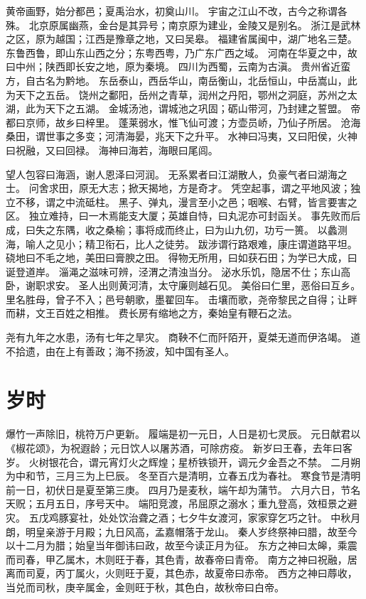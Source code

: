 \documentclass[12pt,UTF8]{ctexbook}
\begin{document}
黄帝画野，始分都邑；夏禹治水，初奠山川。
宇宙之江山不改，古今之称谓各殊。
北京原属幽燕，金台是其异号；南京原为建业，金陵又是别名。
浙江是武林之区，原为越国；江西是豫章之地，又曰吴皋。
福建省属闽中，湖广地名三楚。
东鲁西鲁，即山东山西之分；东粤西粤，乃广东广西之域。
河南在华夏之中，故曰中州；陕西即长安之地，原为秦境。
四川为西蜀，云南为古滇。
贵州省近蛮方，自古名为黔地。
东岳泰山，西岳华山，南岳衡山，北岳恒山，中岳嵩山，此为天下之五岳。
饶州之鄱阳，岳州之青草，润州之丹阳，鄂州之洞庭，苏州之太湖，此为天下之五湖。
金城汤池，谓城池之巩固；砺山带河，乃封建之誓盟。
帝都曰京师，故乡曰梓里。
蓬莱弱水，惟飞仙可渡；方壶员峤，乃仙子所居。
沧海桑田，谓世事之多变；河清海晏，兆天下之升平。
水神曰冯夷，又曰阳侯，火神曰祝融，又曰回禄。
海神曰海若，海眼曰尾闾。

望人包容曰海涵，谢人恩泽曰河润。
无系累者曰江湖散人，负豪气者曰湖海之士。
问舍求田，原无大志；掀天揭地，方是奇才。
凭空起事，谓之平地风波；独立不移，谓之中流砥柱。
黑子、弹丸，漫言至小之邑；咽喉、右臂，皆言要害之区。
独立难持，曰一木焉能支大厦；英雄自恃，曰丸泥亦可封函关。
事先败而后成，曰失之东隅，收之桑榆；事将成而终止，曰为山九仞，功亏一篑。
以蠡测海，喻人之见小；精卫衔石，比人之徒劳。
跋涉谓行路艰难，康庄谓道路平坦。
硗地曰不毛之地，美田曰膏腴之田。
得物无所用，曰如获石田；为学已大成，曰诞登道岸。
淄渑之滋味可辨，泾渭之清浊当分。
泌水乐饥，隐居不仕；东山高卧，谢职求安。
圣人出则黄河清，太守廉则越石见。
美俗曰仁里，恶俗曰互乡。
里名胜母，曾子不入；邑号朝歌，墨翟回车。
击壤而歌，尧帝黎民之自得；让畔而耕，文王百姓之相推。
费长房有缩地之方，秦始皇有鞭石之法。

尧有九年之水患，汤有七年之旱灾。
商鞅不仁而阡陌开，夏桀无道而伊洛竭。
道不拾遗，由在上有善政；海不扬波，知中国有圣人。

\chapter{岁时}

爆竹一声除旧，桃符万户更新。
履端是初一元日，人日是初七灵辰。
元日献君以《椒花颂》，为祝遐龄；元日饮人以屠苏酒，可除疠疫。
新岁曰王春，去年曰客岁。
火树银花合，谓元宵灯火之辉煌；星桥铁锁开，调元夕金吾之不禁。
二月朔为中和节，三月三为上巳辰。
冬至百六是清明，立春五戊为春社。
寒食节是清明前一日，初伏日是夏至第三庚。
四月乃是麦秋，端午却为蒲节。
六月六日，节名天贶；五月五日，序号天中。
端阳竞渡，吊屈原之溺水；重九登高，效桓景之避灾。
五戊鸡豚宴社，处处饮治聋之酒；七夕牛女渡河，家家穿乞巧之针。
中秋月朗，明皇亲游于月殿；九日风高，孟嘉帽落于龙山。
秦人岁终祭神曰腊，故至今以十二月为腊；始皇当年御讳曰政，故至今读正月为征。
东方之神曰太皞，乘震而司春，甲乙属木，木则旺于春，其色青，故春帝曰青帝。
南方之神曰祝融，居离而司夏，丙丁属火，火则旺于夏，其色赤，故夏帝曰赤帝。
西方之神曰蓐收，当兑而司秋，庚辛属金，金则旺于秋，其色白，故秋帝曰白帝。
\end{document}
